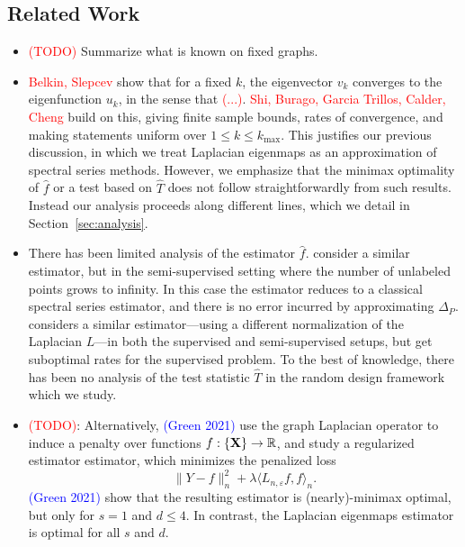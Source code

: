 \documentclass{article}
\newcommand{\Reals}{\mathbb{R}}
\newcommand{\1}{\mathbf{1}}
\newcommand{\dotp}[2]{\langle #1, #2 \rangle}
\newcommand{\wh}[1]{\widehat{#1}}
\theoremstyle{alden}
\theoremstyle{aldenthm}
\theoremstyle{definition}
\theoremstyle{remark}
\begin{document}
\subsection{Related Work}
\begin{itemize}
	\item \textcolor{red}{(TODO)} Summarize what is known on fixed graphs.
	\item \textcolor{red}{Belkin, Slepcev} show that for a fixed $k$, the eigenvector $v_k$ converges to the eigenfunction $u_k$, in the sense that \textcolor{red}{(...)}. \textcolor{red}{Shi, Burago, Garcia Trillos, Calder, Cheng} build on this, giving finite sample bounds, rates of convergence, and making statements uniform over $1 \leq k \leq k_{\max}$. This justifies our previous discussion, in which we treat Laplacian eigenmaps as an approximation of spectral series methods. However, we emphasize that the minimax optimality of $\wh{f}$ or a test based on $\wh{T}$ does not follow straightforwardly from such results. Instead our analysis proceeds along different lines, which we detail in  Section~\ref{sec:analysis}.
	\item There has been limited analysis of the estimator $\wh{f}$. \cite{zhou2011} consider a similar estimator, but in the semi-supervised setting where the number of unlabeled points grows to infinity. In this case the estimator reduces to a classical spectral series estimator, and there is no error incurred by approximating $\Delta_P$. \cite{lee2016} considers a similar estimator---using a different normalization of the Laplacian $L$---in both the supervised and semi-supervised setups, but get suboptimal rates for the supervised problem. To the best of knowledge, there has been no analysis of the test statistic $\wh{T}$ in the random design framework which we study.
	\item \textcolor{red}{(TODO)}: Alternatively, \cite{trillos2020} \textcolor{blue}{(Green 2021)} use the graph Laplacian operator to induce a penalty over functions $f: \{\bf X\} \to \Reals$, and study a regularized estimator estimator, which minimizes the penalized loss
	\begin{equation*}
	\|Y - f\|_n^2 + \lambda \dotp{L_{n,\varepsilon}f}{f}_n.
	\end{equation*}
	\textcolor{blue}{(Green 2021)} show that the resulting estimator is (nearly)-minimax optimal, but only for $s = 1$ and $d \leq 4$. In contrast, the Laplacian eigenmaps estimator is optimal for all $s$ and $d$. 
\end{itemize}
\end{document}
